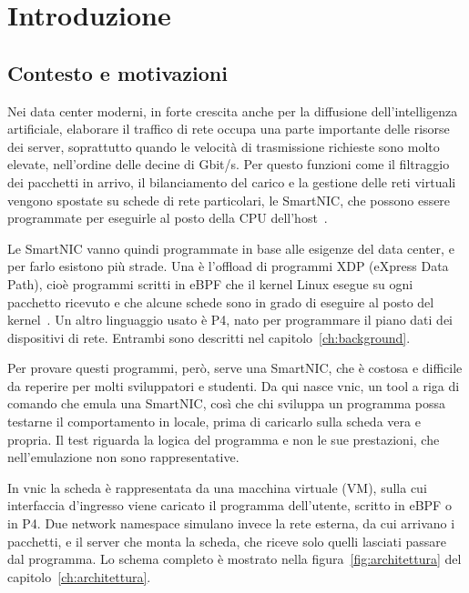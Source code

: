 \chapter{Introduzione}\label{ch:introduzione}

\section{Contesto e motivazioni}\label{sec:contesto}

Nei data center moderni, in forte crescita anche per la diffusione dell'intelligenza artificiale, elaborare il traffico di rete occupa una parte importante delle risorse dei server, soprattutto quando le velocità di trasmissione richieste sono molto elevate, nell'ordine delle decine di Gbit/s. 
Per questo funzioni come il filtraggio dei pacchetti in arrivo, il bilanciamento del carico e la gestione delle reti virtuali vengono spostate su schede di rete particolari, le SmartNIC, che possono essere programmate per eseguirle al posto della CPU dell'host~\cite{nvidia-smartnic}.

Le SmartNIC vanno quindi programmate in base alle esigenze del data center, e per farlo esistono più strade. Una è l'offload di programmi XDP (eXpress Data Path), cioè programmi scritti in eBPF che il kernel Linux esegue su ogni pacchetto ricevuto e che alcune schede sono in grado di eseguire al posto del kernel~\cite{cilium-bpf}. Un altro linguaggio usato è P4, nato per programmare il piano dati dei dispositivi di rete. Entrambi sono descritti nel capitolo~\ref{ch:background}.

Per provare questi programmi, però, serve una SmartNIC, che è costosa e difficile da reperire per molti sviluppatori e studenti. Da qui nasce vnic, un tool a riga di comando che emula una SmartNIC, così che chi sviluppa un programma possa testarne il comportamento in locale, prima di caricarlo sulla scheda vera e propria. Il test riguarda la logica del programma e non le sue prestazioni, che nell'emulazione non sono rappresentative.

In vnic la scheda è rappresentata da una macchina virtuale (VM), sulla cui interfaccia d'ingresso viene caricato il programma dell'utente, scritto in eBPF o in P4. Due network namespace simulano invece la rete esterna, da cui arrivano i pacchetti, e il server che monta la scheda, che riceve solo quelli lasciati passare dal programma. Lo schema completo è mostrato nella figura~\ref{fig:architettura} del capitolo~\ref{ch:architettura}.

